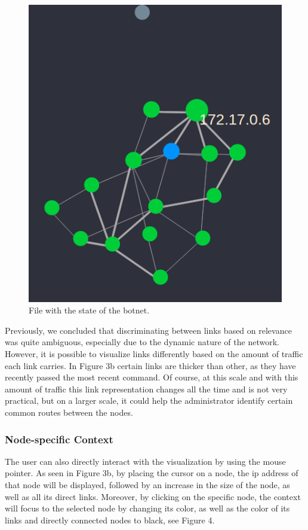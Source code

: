 \documentclass{proc}
\begin{document}
\begin{figure}
  \includegraphics[width=\linewidth]{network_graph.png}
  \caption{File with the state of the botnet.}
  \label{fig1 :bots.csv}
\end{figure}

Previously, we concluded that discriminating between links based on relevance was quite ambiguous, especially due to the dynamic nature of the network. However, it is possible to visualize links differently based on the amount of traffic each link carries. In Figure 3b certain links are thicker than other, as they have recently passed the most recent command. Of course, at this scale and with this amount  of traffic this link representation changes all the time and is not very practical, but on a larger scale, it could help the administrator identify certain common routes between the nodes.

\subsubsection{Node-specific Context}
The user can also directly interact with the visualization by using the mouse pointer. As seen in Figure 3b, by placing the cursor on a node, the ip address of that node will be displayed, followed by an increase in the size of the node, as well as all its direct links. Moreover, by clicking on the specific node, the context will focus to the selected node by changing its color, as well as the color of its links and directly connected nodes to black, see Figure 4. 
\end{document}
